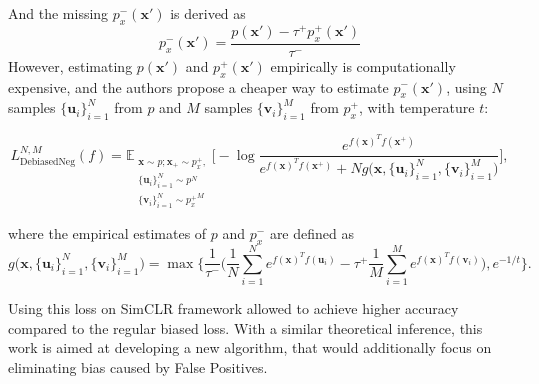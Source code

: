 \documentclass{article}
\begin{document}
And the missing $p^-_x(\textbf{x}')$ is derived as
\begin{equation} \label{eq:5}
p_x^-(\textbf{x}') = \frac{p(\textbf{x}') - \tau^+ p^+_x(\textbf{x}')}{\tau^-}
\end{equation}
However, estimating $p(\textbf{x}')$ and $p^+_x(\textbf{x}')$ empirically is computationally expensive, and the authors propose a cheaper way to estimate $p^-_x(\textbf{x}')$, using $N$ samples $\{\textbf{u}_i\}_{i=1}^N$ from $p$ and $M$ samples $\{\textbf{v}_i\}_{i=1}^M$ from $p_x^+$, with temperature $t$:

\begin{equation} \label{eq:6}
L_{\text{DebiasedNeg}}^{N, M} (f) = \mathbb{E}_{\substack{\textbf{x} \sim p; \textbf{x}_+ \sim p_x^+,\\ \{\textbf{u}_i\}_{i=1}^N \sim p^N \\ \{\textbf{v}_i\}_{i=1}^N \sim {p_x^+}^M}}  \bigg[ -\log \frac{e^{f(\textbf{x})^T f(\textbf{x}^+)} }{e^{f(\textbf{x})^T f(\textbf{x}^+)} + N g\big(\textbf{x}, \{\textbf{u}_i\}_{i=1}^N, \{\textbf{v}_i\}_{i=1}^M\big)} \bigg],
\end{equation}

where the empirical estimates of $p$ and $p_x^-$ are defined as
\begin{equation} \label{eq:7}
g\big(\textbf{x}, \{\textbf{u}_i\}_{i=1}^N, \{\textbf{v}_i\}_{i=1}^M\big) = \max \bigg\{ \frac{1}{\tau^-}\bigg(\frac{1}{N} \sum \limits_{i=1}^N e^{f(\textbf{x})^T f(\textbf{u}_i)} - \tau^+ \frac{1}{M} \sum \limits_{i=1}^M e^{f(\textbf{x})^T f(\textbf{v}_i)}\bigg), e^{-1/t}\bigg\}.
\end{equation}

Using this loss on SimCLR framework allowed to achieve higher accuracy compared to the regular biased loss. With a similar theoretical inference, this work is aimed at developing a new algorithm, that would additionally focus on eliminating bias caused by False Positives.

\end{document}
